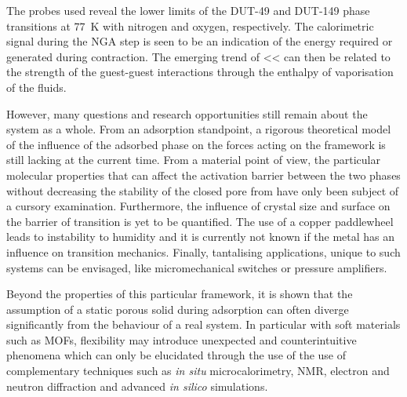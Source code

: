 The probes used reveal the lower limits of the DUT-49
and DUT-149 phase transitions at \SI{77}{\kelvin} with nitrogen and 
oxygen, respectively. The calorimetric signal during the NGA step
is seen to be an indication of the energy required or generated 
during contraction. The emerging trend of <<
can then be related to the strength of the guest-guest interactions
through the enthalpy of vaporisation of the fluids.

However, many questions and research opportunities still remain about the 
system as a whole. From an adsorption standpoint, a rigorous theoretical 
model of the influence of the adsorbed phase on the forces acting on the
framework is still lacking at the current time.
From a material point of view, the particular molecular properties that 
can affect the activation barrier between the two phases without 
decreasing the stability of the closed pore from have only been 
subject of a cursory examination.
Furthermore, the influence of crystal size and surface on the
barrier of transition is yet to be quantified. The use of a copper 
paddlewheel leads to instability to humidity and it is currently
not known if the metal has an influence on transition mechanics.
Finally, tantalising applications, unique to such systems can be 
envisaged, like micromechanical switches or pressure amplifiers.

Beyond the properties of this particular framework, it is shown that 
the assumption of a static porous solid during adsorption can often
diverge significantly from the behaviour of a real system. In particular
with soft materials such as MOFs, flexibility may introduce 
unexpected and counterintuitive phenomena which can only be elucidated 
through the use of the use of complementary techniques such as 
\textit{in situ} microcalorimetry, NMR, electron and neutron diffraction 
and advanced \textit{in silico} simulations.

\FloatBarrier%
\pagebreak